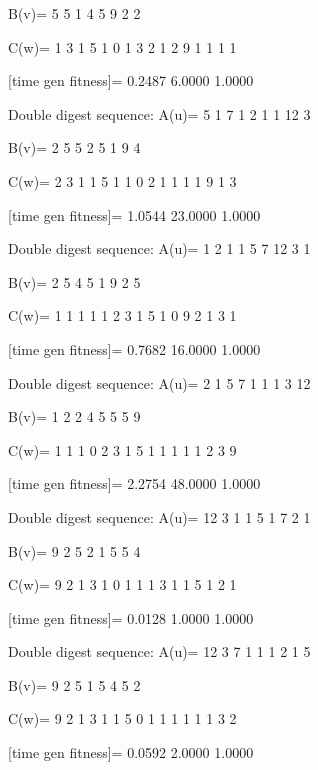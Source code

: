 B(v)=
     5     5     1     4     5     9     2     2

C(w)=
     1     3     1     5     1     0     1     3     2     1     2     9     1     1     1     1

[time gen fitness]=
    0.2487    6.0000    1.0000

Double digest sequence:
A(u)=
     5     1     7     1     2     1     1    12     3

B(v)=
     2     5     5     2     5     1     9     4

C(w)=
     2     3     1     1     5     1     1     0     2     1     1     1     1     9     1     3

[time gen fitness]=
    1.0544   23.0000    1.0000

Double digest sequence:
A(u)=
     1     2     1     1     5     7    12     3     1

B(v)=
     2     5     4     5     1     9     2     5

C(w)=
     1     1     1     1     1     2     3     1     5     1     0     9     2     1     3     1

[time gen fitness]=
    0.7682   16.0000    1.0000

Double digest sequence:
A(u)=
     2     1     5     7     1     1     1     3    12

B(v)=
     1     2     2     4     5     5     5     9

C(w)=
     1     1     1     0     2     3     1     5     1     1     1     1     1     2     3     9

[time gen fitness]=
    2.2754   48.0000    1.0000

Double digest sequence:
A(u)=
    12     3     1     1     5     1     7     2     1

B(v)=
     9     2     5     2     1     5     5     4

C(w)=
     9     2     1     3     1     0     1     1     1     3     1     1     5     1     2     1

[time gen fitness]=
    0.0128    1.0000    1.0000

Double digest sequence:
A(u)=
    12     3     7     1     1     1     2     1     5

B(v)=
     9     2     5     1     5     4     5     2

C(w)=
     9     2     1     3     1     1     5     0     1     1     1     1     1     1     3     2

[time gen fitness]=
    0.0592    2.0000    1.0000

